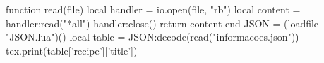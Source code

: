 \documentclass{article}
\begin{document}
\begin{luacode}
function read(file)
    local handler = io.open(file, "rb")
    local content = handler:read("*all")
    handler:close()
    return content
end
JSON = (loadfile "JSON.lua")()
local table = JSON:decode(read("informacoes.json"))
tex.print(table['recipe']['title'])
\end{luacode}
\end{document}
